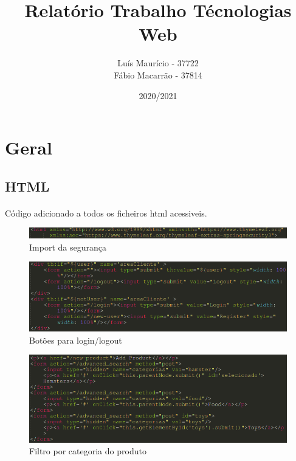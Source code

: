 \documentclass[11pt]{article}
\title{Relatório Trabalho Técnologias Web}
\author{Luís Maurício - 37722\\Fábio Macarrão - 37814\\}
\date{2020/2021}
\begin{document}
	\maketitle

	\newpage
	\section{Geral}
	\subsection{HTML}
	\paragraph{}
	Código adicionado a todos os ficheiros html acessiveis. 
	
	\begin{figure}[htp]
\centering
\includegraphics[scale=0.75]{html.png}
\caption{Import da segurança}
\label{}
\end{figure}
	
\begin{figure}[htp]
\centering
\includegraphics[scale=0.75]{botoes.png}
\caption{Botões para login/logout}
\label{}
\end{figure}

\begin{figure}[htp]
\centering
\includegraphics[scale=0.75]{filtro.png}
\caption{Filtro por categoria do produto}
\label{}
\end{figure}
	
\end{document}
